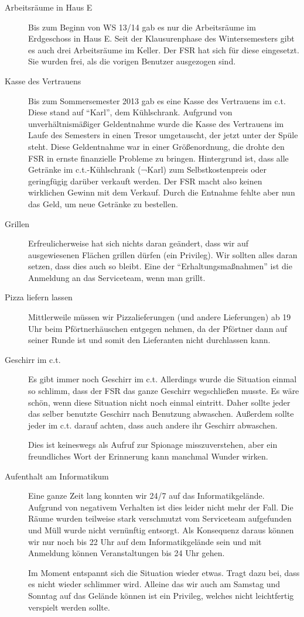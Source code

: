 \documentclass[a4paper,11pt]{scrartcl} %
\begin{document}
	\begin{description}
		\item[Arbeitsräume in Haus E] Bis zum Beginn von WS 13/14 gab es nur die Arbeitsräume im Erdgeschoss in Haus E. Seit der Klausurenphase des Wintersemesters gibt es auch drei Arbeitsräume im Keller. Der FSR hat sich für diese eingesetzt. Sie wurden frei, als die vorigen Benutzer ausgezogen sind.
		\item[Kasse des Vertrauens] Bis zum Sommersemester 2013 gab es eine Kasse des Vertrauens im c.t. Diese stand auf "`Karl"', dem Kühlschrank. Aufgrund von unverhältnismäßiger Geldentnahme wurde die Kasse des Vertrauens im Laufe des Semesters in einen Tresor umgetauscht, der jetzt unter der Spüle steht. Diese Geldentnahme war in einer Größenordnung, die drohte den FSR in ernste finanzielle Probleme zu bringen. Hintergrund ist, dass alle Getränke im c.t.-Kühlschrank (¬Karl) zum Selbstkostenpreis oder geringfügig darüber verkauft werden. Der FSR macht also keinen wirklichen Gewinn mit dem Verkauf. Durch die Entnahme fehlte aber nun das Geld, um neue Getränke zu bestellen.
		\item[Grillen] Erfreulicherweise hat sich nichts daran geändert, dass wir auf ausgewiesenen Flächen grillen dürfen (ein Privileg). Wir sollten alles daran setzen, dass dies auch so bleibt. Eine der "`Erhaltungsmaßnahmen"' ist die Anmeldung an das Serviceteam, wenn man grillt.
		\item[Pizza liefern lassen] Mittlerweile müssen wir Pizzalieferungen (und andere Lieferungen) ab 19 Uhr beim Pförtnerhäuschen entgegen nehmen, da der Pförtner dann auf seiner Runde ist und somit den Lieferanten nicht durchlassen kann.
		\item[Geschirr im c.t.] Es gibt immer noch Geschirr im c.t. Allerdings wurde die Situation einmal so schlimm, dass der FSR das ganze Geschirr wegschließen musste. Es wäre schön, wenn diese Situation nicht noch einmal eintritt. Daher sollte jeder das selber benutzte Geschirr nach Benutzung abwaschen. Außerdem sollte jeder im c.t. darauf achten, dass auch andere ihr Geschirr abwaschen.
		
		Dies ist keineswegs als Aufruf zur Spionage misszuverstehen, aber ein freundliches Wort der Erinnerung kann manchmal Wunder wirken.
		\item[Aufenthalt am Informatikum] Eine ganze Zeit lang konnten wir 24/7 auf das Informatikgelände. Aufgrund von negativem Verhalten ist dies leider nicht mehr der Fall. Die Räume wurden teilweise stark verschmutzt vom Serviceteam aufgefunden und Müll wurde nicht vernünftig entsorgt. Als Konsequenz daraus können wir nur noch bis 22 Uhr auf dem Informatikgelände sein und mit Anmeldung können Veranstaltungen bis 24 Uhr gehen.
		
		Im Moment entspannt sich die Situation wieder etwas. Tragt dazu bei, dass es nicht wieder schlimmer wird. Alleine das wir auch am Samstag und Sonntag auf das Gelände können ist ein Privileg, welches nicht leichtfertig verspielt werden sollte.
	\end{description}
\end{document}
